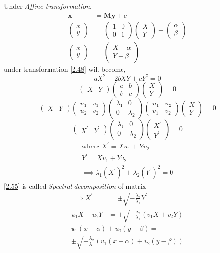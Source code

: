 \documentclass[journal,12pt,twocolumn]{IEEEtran}
\let\vec\mathbf
\numberwithin{equation}{subsection}
\newcommand{\myvec}[1]{\ensuremath{\begin{pmatrix}#1\end{pmatrix}}}
\begin{document}
Under \textit{Affine transformation},
\begin{align}
	\vec{x} &= \vec{M}\vec{y} + c\\
	\myvec{x \\ y} &= \myvec{1 & 0 \\ 0 & 1} \myvec{X \\ Y} + \myvec{\alpha \\ \beta}\\
	\label{2.48}\myvec{x \\ y} &= \myvec{X+\alpha \\ Y+\beta}
\end{align}
 under transformation \ref{2.48} will become,
\begin{equation}\label{2.49}
	aX^2 + 2bXY + cY^2 = 0
\end{equation}
\begin{equation}\label{2.50}
	\myvec{X & Y} \myvec{a & b \\ b & c} \myvec{X \\ Y} = 0
\end{equation}
\begin{equation}\label{2.51}
	\myvec{X & Y} \myvec{u_1 & v_1 \\ u_2 & v_2} \myvec{\lambda_1 & 0\\ 0 & \lambda_2} \myvec{u_1 & u_2 \\ v_1 & v_2} \myvec{X \\ Y} = 0
\end{equation}
\begin{equation}
	\myvec{X^\prime & Y^\prime}  \myvec{\lambda_1 & 0\\ 0 & \lambda_2} \myvec{X^\prime \\ Y^\prime} = 0
\end{equation}
\begin{align}
	\text{where } X^\prime = Xu_1 + Yu_2 \\
Y^\prime = Xv_1 + Yv_2\\
	\implies \lambda_1 (X^\prime)^2 + \lambda_2 (Y^\prime)^2 = 0 \label{2.55}
\end{align}
\ref{2.55} is called \textit{Spectral decomposition} of matrix
\begin{align}
	\implies X^\prime &= \pm \sqrt{-\frac{\lambda_2}{\lambda_1}}Y^\prime\\	
	u_1X + u_2Y &= \pm \sqrt{-\frac{\lambda_2}{\lambda_1}}(v_1X + v_2Y)
\end{align}
\begin{multline}
	u_1(x-\alpha) + u_2(y-\beta) = \\ \pm \sqrt{-\frac{\lambda_2}{\lambda_1}}(v_1(x-\alpha) + v_2(y-\beta))  \label{2.57}
\end{multline}
\end{document}
